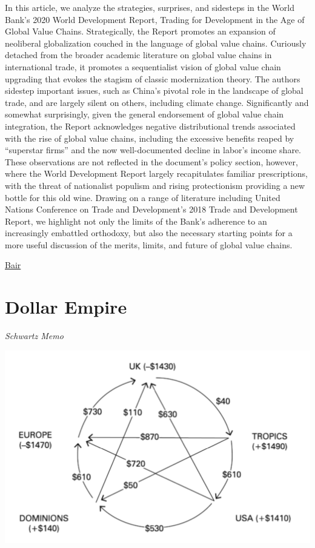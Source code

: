 \documentclass[
]{book}
\begin{document}
In this article, we analyze the strategies, surprises, and sidesteps in the World Bank's 2020 World Development Report, Trading for Development in the Age of Global Value Chains. Strategically, the Report promotes an expansion of neoliberal globalization couched in the language of global value chains. Curiously detached from the broader academic literature on global value chains in international trade, it promotes a sequentialist vision of global value chain upgrading that evokes the stagism of classic modernization theory. The authors sidestep important issues, such as China's pivotal role in the landscape of global trade, and are largely silent on others, including climate change. Significantly and somewhat surprisingly, given the general endorsement of global value chain integration, the Report acknowledges negative distributional trends associated with the rise of global value chains, including the excessive benefits reaped by ``superstar firms'' and the now well-documented decline in labor's income share. These observations are not reflected in the document's policy section, however, where the World Development Report largely recapitulates familiar prescriptions, with the threat of nationalist populism and rising protectionism providing a new bottle for this old wine. Drawing on a range of literature including United Nations Conference on Trade and Development's 2018 Trade and Development Report, we highlight not only the limits of the Bank's adherence to an increasingly embattled orthodoxy, but also the necessary starting points for a more useful discussion of the merits, limits, and future of global value chains.

\href{https://journals.sagepub.com/doi/abs/10.1177/0308518X211006718}{Bair}

\hypertarget{dollar-empire}{%
\section{Dollar Empire}\label{dollar-empire}}

\emph{Schwartz Memo}

\includegraphics{fig/net-world-trade-surplusses-1928.png}
\end{document}
